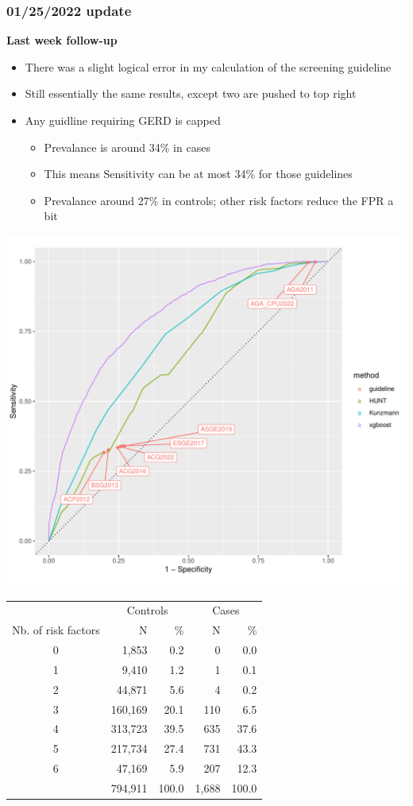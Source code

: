 \documentclass[12pt]{article}
\begin{document}
\pagebreak
\subsubsection*{01/25/2022 update}

\textbf{Last week follow-up}
\begin{itemize}
	\item There was a slight logical error in my calculation of the screening guideline
	\item Still essentially the same results, except two are pushed to top right
	\item Any guidline requiring GERD is capped
	\begin{itemize}
		\item Prevalance is around 34\% in cases
		\item This means Sensitivity can be at most 34\% for those guidelines
		\item Prevalance around 27\% in controls; other risk factors reduce the FPR a bit
	\end{itemize}
\end{itemize}


\begin{center}
\includegraphics[width=\textwidth]{xgb_kunzmann_hunt_screening_roc.pdf}
\end{center}

\begin{table}
\centering
\begin{tabular}{crrrr}
\toprule 
 & \multicolumn{2}{c}{Controls} & \multicolumn{2}{c}{Cases}\tabularnewline
\cmidrule(lr){2-3}\cmidrule(l){4-5} 
Nb. of risk factors & N & \% & N & \%\tabularnewline
\midrule
0 & 1,853 & 0.2 & 0 & 0.0\tabularnewline
1 & 9,410 & 1.2 & 1 & 0.1\tabularnewline
2 & 44,871 & 5.6 & 4 & 0.2\tabularnewline
3 & 160,169 & 20.1 & 110 & 6.5\tabularnewline
4 & 313,723 & 39.5 & 635 & 37.6\tabularnewline
5 & 217,734 & 27.4 & 731 & 43.3\tabularnewline
6 & 47,169 & 5.9 & 207 & 12.3\tabularnewline
\cmidrule(lr){2-3}\cmidrule(l){4-5} 
 & 794,911 & 100.0 & 1,688 & 100.0\tabularnewline
\bottomrule
\end{tabular}
\end{table}
\end{document}
